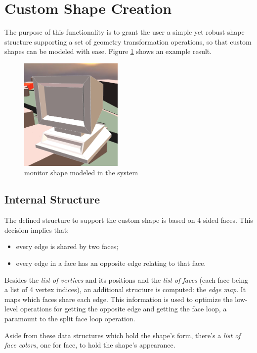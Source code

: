 
\section{Custom Shape Creation}

The purpose of this functionality is to grant the user a simple yet robust shape
structure supporting a set of geometry transformation operations,
so that custom shapes can be modeled with ease. Figure \ref{fig:example} shows an example result.

\begin{figure}[!ht]
	\centering
	\includegraphics[width=5cm]{gfx/ex-monitor.png}
	\caption{monitor shape modeled in the system}
	\label{fig:example}
\end{figure}

\subsection{Internal Structure}

The defined structure to support the custom shape is based on 4 sided faces.
This decision implies that:
\begin{itemize}
	\item every edge is shared by two faces;
	\item every edge in a face has an opposite edge relating to that face.
\end{itemize}

Besides the \emph{list of vertices} and its positions and the \emph{list of faces}
(each face being a list of 4 vertex indices),
an additional structure is computed: the \emph{edge map}.
It maps which faces share each edge.
This information is used to optimize the low-level operations for
getting the opposite edge and getting the face loop,
a	paramount to the split face loop operation.

Aside from these data structures which hold the shape's form,
there's a \emph{list of face colors}, one for face, to hold the shape's appearance.

